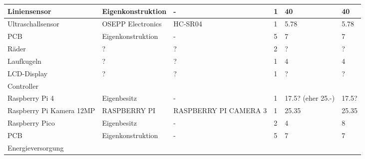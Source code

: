 \documentclass[main.tex]{subfiles} %
\begin{document}
\begin{table}[h]
\begin{tabular}{|p{3cm}|p{3cm}|p{3cm}|p{1cm}|p{1.5cm}|p{1cm}|}
        Liniensensor                           & Eigenkonstruktion   & -                       & 1               & 40                        & 40                          \\ \hline
        Ultraschallsensor                      & OSEPP Electronics   & HC-SR04                 & 1               & 5.78                      & 5.78                        \\ \hline
        PCB                                    & Eigenkonstruktion   & -                       & 5               & 7                         & 7                           \\ \hline
        Räder                                  & ?                   & ?                       & 2               & ?                         & ?                           \\ \hline
        Laufkugeln                             & ?                   & ?                       & 1               & 4                         & 4                           \\ \hline
        LCD-Display                            & ?                   & ?                       & 1               & ?                         & ?                           \\ \hline
        \rowcolor{lightgray} Controller        &                     &                         &                 &                           &                             \\ \hline
        Raspberry Pi 4                         & Eigenbesitz         & -                       & 1               & 17.5? (eher 25.-)         & 17.5?                       \\ \hline
        Raspberry Pi Kamera 12MP               & RASPBERRY PI        & RASPBERRY PI CAMERA 3   & 1               & 25.35                     & 25.35                       \\ \hline
        Raspberry Pico                         & Eigenbesitz         & -                       & 2               & 4                         & 8                           \\ \hline
        PCB                                    & Eigenkonstruktion   & -                       & 5               & 7                         & 7                           \\ \hline
        \rowcolor{lightgray} Energieversorgung &                     &                         &                 &                           &                             \\ \hline

\end{tabular}
\end{table}
\end{document}
